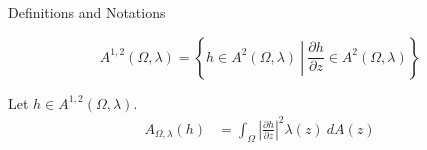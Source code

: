 \documentclass{reu_beamer}
\begin{document}
\begin{frame}{Definitions and Notations}
    \begin{definition}
        \[A^{1,2}(\Omega,\lambda) = \left\{h \in A^{2}(\Omega,\lambda)\ \left|\ \frac{\partial h}{\partial z} \in A^2(\Omega,\lambda)\right.\right\}\]
    \end{definition}

    \begin{definition}
        Let $h\in A^{1,2}(\Omega,\lambda)$.
        \begin{align*}
            A_{\Omega,\lambda}(h) &= \int_{\Omega}\left\vert \frac{\partial h}{\partial z}\right\vert^2 \lambda(z)\:dA(z)
        \end{align*}
    \end{definition}
\end{frame}
\end{document}
